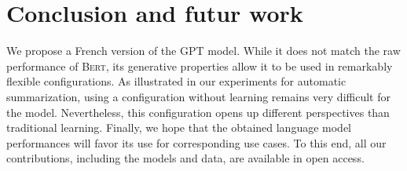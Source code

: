 \section{Conclusion and futur work}

We propose a French version of the GPT model. While it does not match the raw performance of \textsc{Bert}, its generative properties allow it to be used in remarkably flexible configurations. As illustrated in our experiments for automatic summarization, using a configuration without learning remains very difficult for the model. Nevertheless, this configuration opens up different perspectives than traditional learning. Finally, we hope that the obtained language model performances will favor its use for corresponding use cases. To this end, all our contributions, including the models and data, are available in open access.


